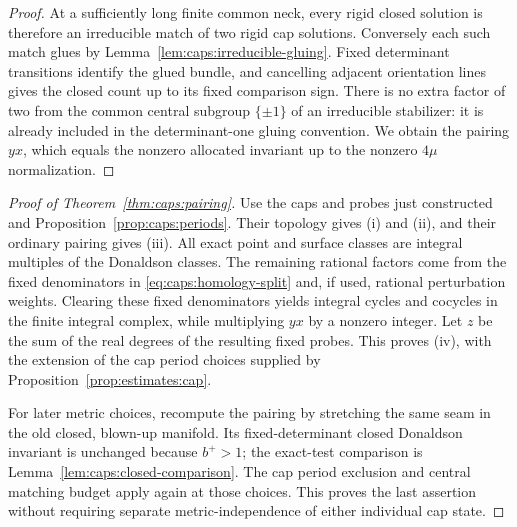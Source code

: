 \begin{proof}
At a sufficiently long finite common neck, every rigid closed solution
is therefore an irreducible match of two rigid cap solutions.  Conversely
each such match glues by Lemma~\ref{lem:caps:irreducible-gluing}.
Fixed determinant transitions identify the glued bundle, and cancelling
adjacent orientation lines gives the closed count up to its fixed
comparison sign.  There is no extra factor of two from the common
central subgroup $\{\pm1\}$ of an irreducible stabilizer: it is already
included in the determinant-one gluing convention.  We obtain the
pairing $yx$, which equals the nonzero allocated invariant up to the
nonzero $4\mu$ normalization.
\end{proof}

\begin{proof}[Proof of Theorem~\ref{thm:caps:pairing}]
Use the caps and probes just constructed and
Proposition~\ref{prop:caps:periods}.  Their topology gives (i) and (ii),
and their ordinary pairing gives (iii).  All exact point and surface
classes are integral multiples of the Donaldson classes.  The remaining
rational factors come from the fixed denominators in
\eqref{eq:caps:homology-split} and, if used, rational perturbation
weights.  Clearing these fixed denominators yields integral cycles and
cocycles in the finite integral complex, while multiplying $yx$ by a
nonzero integer.  Let $z$ be the sum of the real degrees of the resulting
fixed probes.  This proves (iv), with the extension of the cap period
choices supplied by Proposition~\ref{prop:estimates:cap}.

For later metric choices, recompute the pairing by stretching the same
seam in the old closed, blown-up manifold.  Its fixed-determinant closed
Donaldson invariant is unchanged because $b^+>1$; the exact-test
comparison is Lemma~\ref{lem:caps:closed-comparison}.  The cap period
exclusion and central matching budget apply again at those choices.
This proves the last assertion without requiring separate
metric-independence of either individual cap state.
\end{proof}

